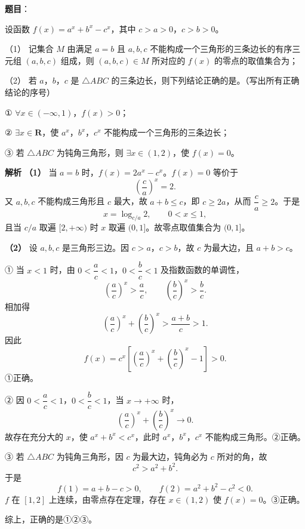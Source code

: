 \begin{answer}

\textbf{题目}：

设函数 $f(x)=a^x+b^x-c^x$，其中 $c>a>0$，$c>b>0$。

（1） 记集合 $M$ 由满足 $a=b$ 且 $a,b,c$ 不能构成一个三角形的三条边长的有序三元组 $(a,b,c)$ 组成，则 $(a,b,c)\in M$ 所对应的 $f(x)$ 的零点的取值集合为\gkblank{}；

（2） 若 $a$，$b$，$c$ 是 $\triangle ABC$ 的三条边长，则下列结论正确的是\gkblank{}。（写出所有正确结论的序号）

① $\forall x\in(-\infty,1)$，$f(x)>0$；

② $\exists x\in\mathbf R$，使 $a^x$，$b^x$，$c^x$ 不能构成一个三角形的三条边长；

③ 若 $\triangle ABC$ 为钝角三角形，则 $\exists x\in(1,2)$，使 $f(x)=0$。

\textbf{解析}
\textbf{（1）} 当 $a=b$ 时，$f(x)=2a^x-c^x$。$f(x)=0$ 等价于
\nopagebreak[4]
\[\left(\frac ca\right)^x=2.\]
又 $a,b,c$ 不能构成三角形且 $c$ 最大，故 $a+b\leqslant c$，即 $c\geqslant2a$，从而 $\dfrac ca\geqslant2$。于是
\nopagebreak[4]
\[x=\log_{c/a}2,\qquad 0<x\leqslant1,\]
且当 $c/a$ 取遍 $[2,+\infty)$ 时 $x$ 取遍 $(0,1]$。故零点取值集合为 $(0,1]$。

\textbf{（2）} 设 $a,b,c$ 是三角形三边。因 $c>a$，$c>b$，故 $c$ 为最大边，且 $a+b>c$。

① 当 $x<1$ 时，由 $0<\dfrac ac<1$，$0<\dfrac bc<1$ 及指数函数的单调性，
\nopagebreak[4]
\[\left(\frac ac\right)^x>\frac ac,\qquad
\left(\frac bc\right)^x>\frac bc.\]
相加得
\nopagebreak[4]
\[\left(\frac ac\right)^x+\left(\frac bc\right)^x>\frac{a+b}{c}>1.\]
因此
\nopagebreak[4]
\[f(x)=c^x\left[\left(\frac ac\right)^x+\left(\frac bc\right)^x-1\right]>0.\]
①正确。

② 因 $0<\dfrac ac<1$，$0<\dfrac bc<1$，当 $x\to+\infty$ 时，
\nopagebreak[4]
\[\left(\frac ac\right)^x+\left(\frac bc\right)^x\to0.\]
故存在充分大的 $x$，使 $a^x+b^x<c^x$，此时 $a^x$，$b^x$，$c^x$ 不能构成三角形。②正确。

③ 若 $\triangle ABC$ 为钝角三角形，因 $c$ 为最大边，钝角必为 $c$ 所对的角，故
\nopagebreak[4]
\[c^2>a^2+b^2.\]
于是
\nopagebreak[4]
\[f(1)=a+b-c>0,\qquad f(2)=a^2+b^2-c^2<0.\]
$f$ 在 $[1,2]$ 上连续，由零点存在定理，存在 $x\in(1,2)$ 使 $f(x)=0$。③正确。

综上，正确的是①②③。

\gkanswer{答案（1）：$(0,1]$。$a=b$ 且不能构成三角形时 $c\geqslant2a$，由 $2a^x=c^x$ 得 $x=\log_{c/a}2\in(0,1]$。}


\end{answer}
